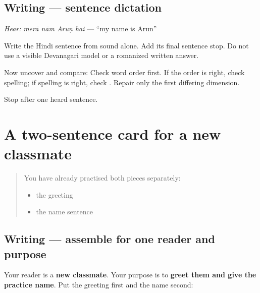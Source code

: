 \subsection*{Writing — sentence dictation}
\emph{Hear:} \emph{merā nām Aruṇ hai} — \textquotedblleft{}my name is Arun\textquotedblright{}

Write the Hindi sentence from sound alone. Add its final sentence stop. Do not use a visible Devanagari model or a romanized written answer.

Now uncover and compare: \textbf{   } Check word order first. If the order is right, check spelling; if spelling is right, check \textbf{}. Repair only the first differing dimension.

\begin{tcolorbox}[breakable,colback=teal!4,colframe=teal!35!black,title={Before you move on}]
Stop after one heard sentence.
\end{tcolorbox}
\section[\texorpdfstring{\hi{नमस्ते।} \hi{मेरा} \hi{नाम} … (namaste. merā …)}{नमस्ते। मेरा नाम … (namaste. merā …)}]{A two-sentence card for a new classmate}

\label{lesson:HI-W06-two-sentence-card}



\begin{quote}
You have already practised both pieces separately:

\begin{itemize}
\raggedright
  \item the greeting \textbf{}
  \item the name sentence \textbf{   }
\end{itemize}
\end{quote}

\subsection*{Writing — assemble for one reader and purpose}
Your reader is a \textbf{new classmate}. Your purpose is to \textbf{greet them and give the practice name}. Put the greeting first and the name second:

\begin{quote}
\textbf{    }
\end{quote}

